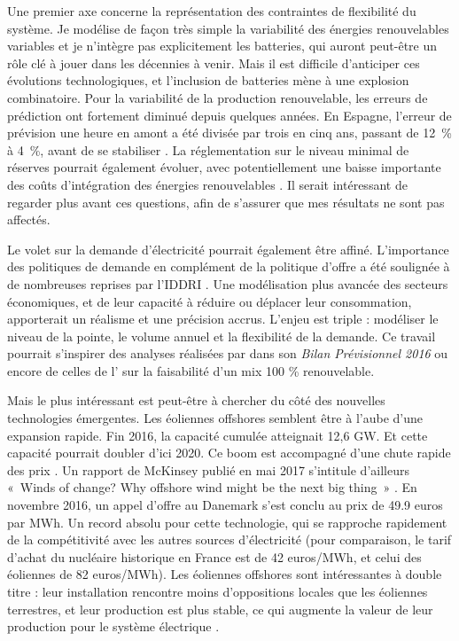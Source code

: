 Une premier axe concerne la représentation des contraintes de flexibilité du système. Je modélise de façon très simple la variabilité des énergies renouvelables variables et je n'intègre pas explicitement les batteries, qui auront peut-être un rôle clé à jouer dans les décennies à venir. Mais il est difficile d'anticiper ces évolutions technologiques, et l'inclusion de batteries mène à une explosion combinatoire. 
Pour la variabilité de la production renouvelable, les erreurs de prédiction ont fortement diminué depuis quelques années. En Espagne, l’erreur de prévision une heure en amont a été divisée par trois en cinq ans, passant de 12~\% à 4~\%, avant de se stabiliser \citep{IRENA2017}. La réglementation sur le niveau minimal de réserves pourrait également évoluer, avec potentiellement une baisse importante des coûts d'intégration des énergies renouvelables \citep{Lorenz2017}. Il serait intéressant de regarder plus avant ces questions, afin de s’assurer que mes résultats ne sont pas affectés. 

Le volet sur la demande d’électricité pourrait également être affiné. L’importance des politiques de demande en complément de la politique d’offre a été soulignée à de nombreuses reprises par l'IDDRI \citep{Berghmans2017, Rudinger2017}. Une modélisation plus avancée des secteurs économiques, et de leur capacité à réduire ou déplacer leur consommation, apporterait un réalisme et une précision accrus. L'enjeu est triple : modéliser le niveau de la pointe, le volume annuel et la flexibilité de la demande. Ce travail pourrait s'inspirer des analyses réalisées par \citet{RTE2016} dans son \textit{Bilan Prévisionnel 2016} ou encore de celles de l'\citet{ADEME2015} sur la faisabilité d'un mix 100 \% renouvelable.

Mais le plus intéressant est peut-être à chercher du côté des nouvelles technologies émergentes. 
Les éoliennes offshores semblent être à l’aube d’une expansion rapide. Fin 2016, la capacité cumulée atteignait 12,6 GW. Et cette capacité pourrait doubler d’ici 2020. Ce boom est accompagné d’une chute rapide des prix \citep[p.14]{IRENA2017a}. Un rapport de McKinsey publié en mai 2017 s’intitule d’ailleurs «~Winds of change? Why offshore wind might be the next big thing~» \citep{McKinsey2017Wind}. En novembre 2016, un appel d’offre au Danemark s’est conclu au prix de 49.9 euros par MWh. Un record absolu pour cette technologie, qui se rapproche rapidement de la compétitivité avec les autres sources d’électricité (pour comparaison, le tarif d'achat du nucléaire historique en France est de 42 euros/MWh, et celui des éoliennes de 82 euros/MWh). Les éoliennes offshores sont intéressantes à double titre : leur installation rencontre moins d’oppositions locales que les éoliennes terrestres, et leur production est plus stable, ce qui augmente la valeur de leur production pour le système électrique \citep{Hirth2016}.

